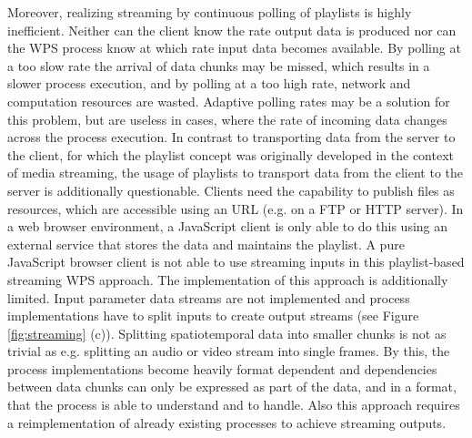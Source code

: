	Moreover, realizing streaming by continuous polling of playlists is highly inefficient. Neither can the client know the rate output data is produced nor can the \ac{WPS} process know at which rate input data becomes available. By polling at a too slow rate the arrival of data chunks may be missed, which results in a slower process execution, and by polling at a too high rate, network and computation resources are wasted. Adaptive polling rates may be a solution for this problem, but are useless in cases, where the rate of incoming data changes across the process execution. In contrast to transporting data from the server to the client, for which the playlist concept was originally developed in the context of media streaming, the usage of playlists to transport data from the client to the server is additionally questionable. Clients need the capability to publish files as resources, which are accessible using an URL (e.g. on a FTP or HTTP server). In a web browser environment, a JavaScript client is only able to do this using an external service that stores the data and maintains the playlist. A pure JavaScript browser client is not able to use streaming inputs in this playlist-based streaming \ac{WPS} approach. The implementation of this approach is additionally limited. Input parameter data streams are not implemented and process implementations have to split inputs to create output streams (see Figure \ref{fig:streaming} (c)). Splitting spatiotemporal data into smaller chunks is not as trivial as e.g. splitting an audio or video stream into single frames. By this, the process implementations become heavily format dependent and dependencies between data chunks can only be expressed as part of the data, and in a format, that the process is able to understand and to handle. Also this approach requires a reimplementation of already existing processes to achieve streaming outputs.

